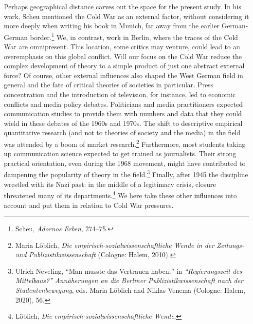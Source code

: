 \documentclass{tufte-handout}
\begin{document}
Perhaps geographical distance carves out the space for the present
study. In his work, Scheu mentioned the Cold War as an external factor,
without considering it more deeply when writing his book in Munich, far
away from the earlier German-German border.\footnote{Scheu,
  \emph{Adornos Erben}, 274--75.} We, in contrast, work in Berlin, where
the traces of the Cold War are omnipresent. This location, some critics
may venture, could lead to an overemphasis on this global conflict. Will
our focus on the Cold War reduce the complex development of theory to a
simple product of just one abstract external force? Of course, other
external influences also shaped the West German field in general and the
fate of critical theories of societies in particular. Press
concentration and the introduction of television, for instance,
led to economic conflicts and media policy debates. Politicians and
media practitioners expected communication studies to provide them with
numbers and data that they could wield in these debates of the 1960s and
1970s. The shift to descriptive empirical quantitative research (and not
to theories of society and the media) in the field was attended by a
boom of market research.\footnote{Maria Löblich, \emph{Die
  empirisch-sozialwissenschaftliche Wende in der Zeitungs- und
  Publizistikwissenschaft} (Cologne: Halem, 2010).} Furthermore, most
students taking up communication science expected to get trained as
journalists. Their strong practical orientation, even during the 1968
movement, might have contributed to dampening the popularity of theory
in the field.\footnote{Ulrich Neveling, ``Man musste das Vertrauen
  haben,'' in \emph{``Regierungszeit des Mittelbaus?'' Annäherungen an
  die Berliner Publizistikwissenschaft nach der Studentenbewegung}, eds.
  Maria Löblich and Niklas Venema (Cologne: Halem, 2020), 56.} Finally,
after 1945 the discipline wrestled with its Nazi past: in the middle of
a legitimacy crisis, closure threatened many of its
departments.\footnote{Löblich, \emph{Die
  empirisch-sozialwissenschaftliche Wende}.} We here take these other
influences into account and put them in relation to Cold War pressures.
\end{document}
